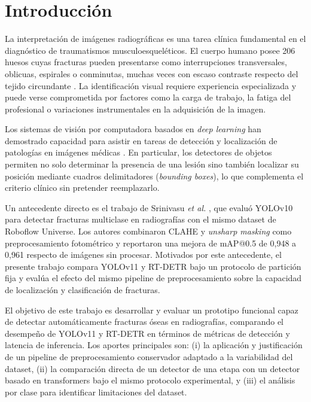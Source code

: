 \documentclass[conference]{IEEEtran}
\begin{document}
\section{Introducción}

La interpretación de imágenes radiográficas es una tarea clínica fundamental en el
diagnóstico de traumatismos musculoesqueléticos. El cuerpo humano posee 206 huesos
cuyas fracturas pueden presentarse como interrupciones transversales, oblicuas,
espirales o conminutas, muchas veces con escaso contraste respecto del tejido
circundante \cite{b1}. La identificación visual requiere experiencia especializada y
puede verse comprometida por factores como la carga de trabajo, la fatiga del
profesional o variaciones instrumentales en la adquisición de la imagen.

Los sistemas de visión por computadora basados en \textit{deep learning} han
demostrado capacidad para asistir en tareas de detección y localización de
patologías en imágenes médicas \cite{b2}. En particular, los detectores de objetos
permiten no solo determinar la presencia de una lesión sino también localizar su
posición mediante cuadros delimitadores (\textit{bounding boxes}), lo que
complementa el criterio clínico sin pretender reemplazarlo.

Un antecedente directo es el trabajo de Srinivasu \textit{et al.} \cite{b1}, que
evaluó YOLOv10 para detectar fracturas multiclase en radiografías con el mismo
dataset de Roboflow Universe. Los autores combinaron CLAHE y \textit{unsharp masking}
como preprocesamiento fotométrico y reportaron una mejora de mAP@0.5 de 0,948 a
0,961 respecto de imágenes sin procesar. Motivados por este antecedente, el presente
trabajo compara YOLOv11 y RT-DETR bajo un protocolo de partición fija y evalúa el
efecto del mismo pipeline de preprocesamiento sobre la capacidad de localización y
clasificación de fracturas.

El objetivo de este trabajo es desarrollar y evaluar un prototipo funcional capaz
de detectar automáticamente fracturas óseas en radiografías, comparando el
desempeño de YOLOv11 \cite{b3} y RT-DETR \cite{b4} en términos de métricas de
detección y latencia de inferencia. Los aportes principales son: (i) la aplicación
y justificación de un pipeline de preprocesamiento conservador adaptado a la
variabilidad del dataset, (ii) la comparación directa de un detector de una etapa
con un detector basado en transformers bajo el mismo protocolo experimental, y
(iii) el análisis por clase para identificar limitaciones del dataset.
\end{document}
